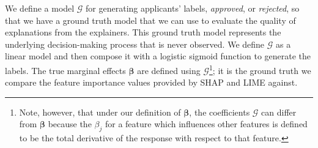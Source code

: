 \documentclass[mnsc,blindrev]{informs3}
\begin{document}
\begin{table}[h]
\centering
{}
\caption{Description of features for simulated loan data.}
\label{tab:simulated}
\end{table}



   We define a model $\mathcal{G}$ for generating applicants' labels, \textit{approved}, or \textit{rejected}, so that we have a ground truth model that we can use to evaluate the quality of explanations from the explainers. This ground truth model represents the underlying decision-making process that is never observed.  We define $\mathcal{G}$ as a linear model and then compose it with a logistic sigmoid function to generate the labels. The true marginal effects $\boldsymbol{\beta}$ are defined using $\mathcal{G}$\footnote{Note, however, that under our definition of $\boldsymbol{\beta}$, the coefficients $\mathcal{G}$ can differ from $\boldsymbol{\beta}$ because the $\beta_j$ for a feature which influences other features is defined to be the total derivative of the response with respect to that feature.}; it is the ground truth we compare the feature importance values provided by SHAP and LIME against.
   
\end{document}
